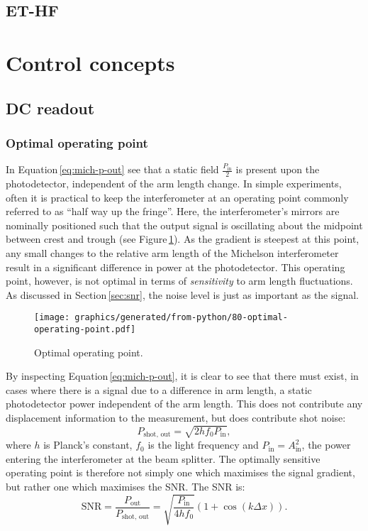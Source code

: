 \subsection{ET-HF}

\section{Control concepts}
\subsection{DC readout}
\subsubsection{Optimal operating point}
In Equation\,\ref{eq:mich-p-out} see that a static field $\frac{P_{\text{in}}}{2}$ is present upon the photodetector, independent of the arm length change. In simple experiments, often it is practical to keep the interferometer at an operating point commonly referred to as ``half way up the fringe''. Here, the interferometer's mirrors are nominally positioned such that the output signal is oscillating about the midpoint between crest and trough (see Figure\,\ref{fig:optimal-operating-point}). As the gradient is steepest at this point, any small changes to the relative arm length of the Michelson interferometer result in a significant difference in power at the photodetector. This operating point, however, is not optimal in terms of \emph{sensitivity} to arm length fluctuations. As discussed in Section\,\ref{sec:snr}, the noise level is just as important as the signal.

\begin{figure}
  \centering
  \texttt{[image: graphics/generated/from-python/80-optimal-operating-point.pdf]}
  \caption[Fringe]{\label{fig:optimal-operating-point}Optimal operating point.}
\end{figure}

By inspecting Equation\,\ref{eq:mich-p-out}, it is clear to see that there must exist, in cases where there is a signal due to a difference in arm length, a static photodetector power independent of the arm length. This does not contribute any displacement information to the measurement, but does contribute shot noise:
\begin{equation}
  P_{\text{shot, out}} = \sqrt{2 h f_0 P_{\text{in}}},
\end{equation}
where $h$ is Planck's constant, $f_0$ is the light frequency and $P_{\text{in}} = A_{\text{in}}^2$, the power entering the interferometer at the beam splitter. The optimally sensitive operating point is therefore not simply one which maximises the signal gradient, but rather one which maximises the SNR. The SNR is:
\begin{equation}
  \text{SNR} = \frac{P_{\text{out}}}{P_{\text{shot, out}}} = \sqrt{\frac{P_{\text{in}}}{4 h f_0}} \left( 1 + \cos \left(k \Delta x \right) \right).
\end{equation}

